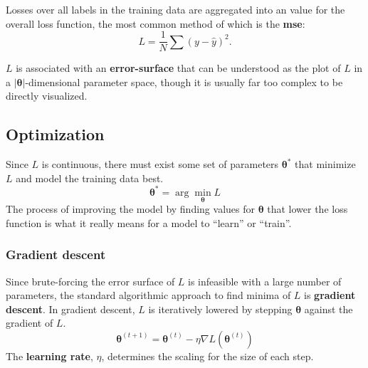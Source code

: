 \documentclass[12pt]{report}
\theoremstyle{definition}
\theoremstyle{remark}
\begin{document}
Losses over all labels in the training data are aggregated into an value for the overall loss function, the most common method of which is the \textbf{\gls{mse}}:
\begin{equation}
    L = \frac{1}{N}\sum (y - \hat{y})^2 .
\end{equation}

$L$ is associated with an \textbf{\gls{error-surface}} that can be understood as the plot of $L$ in a $|\boldsymbol{\theta}|$-dimensional parameter space, though it is usually far too complex to be directly visualized.

\subsection{Optimization}\label{sec:optimization}

Since $L$ is continuous, there must exist some set of parameters $\boldsymbol{\theta}^\ast$ that minimize $L$ and model the training data best.
\begin{equation}
    \boldsymbol{\theta}^\ast = \arg\min_{\boldsymbol{\theta}} L
\end{equation}
The process of improving the model by finding values for $\boldsymbol{\theta}$ that lower the loss function is what it really means for a model to ``learn'' or ``train''.

\subsubsection{Gradient descent}

Since brute-forcing the error surface of $L$ is infeasible with a large number of parameters, the standard algorithmic approach to find minima of $L$ is \textbf{gradient descent}. In gradient descent, $L$ is iteratively lowered by stepping $\boldsymbol{\theta}$ against the gradient of $L$.
\begin{equation}
    \boldsymbol{\theta}^{(t+1)} = \boldsymbol{\theta}^{(t)}-\eta\nabla L(\boldsymbol{\theta}^{(t)})
\end{equation}
The \textbf{learning rate}, $\eta$, determines the scaling for the size of each step.
\end{document}
